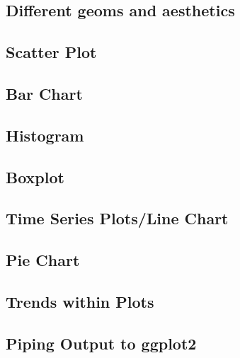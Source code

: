 \documentclass[
]{book}
\begin{document}
\hypertarget{different-geoms-and-aesthetics}{%
\subsection{Different geoms and aesthetics}\label{different-geoms-and-aesthetics}}

\hypertarget{scatter-plot}{%
\subsection{Scatter Plot}\label{scatter-plot}}

\hypertarget{bar-chart}{%
\subsection{Bar Chart}\label{bar-chart}}

\hypertarget{histogram}{%
\subsection{Histogram}\label{histogram}}

\hypertarget{boxplot}{%
\subsection{Boxplot}\label{boxplot}}

\hypertarget{time-series-plotsline-chart}{%
\subsection{Time Series Plots/Line Chart}\label{time-series-plotsline-chart}}

\hypertarget{pie-chart}{%
\subsection{Pie Chart}\label{pie-chart}}

\hypertarget{trends-within-plots}{%
\subsection{Trends within Plots}\label{trends-within-plots}}

\hypertarget{piping-output-to-ggplot2}{%
\subsection{Piping Output to ggplot2}\label{piping-output-to-ggplot2}}
\end{document}
